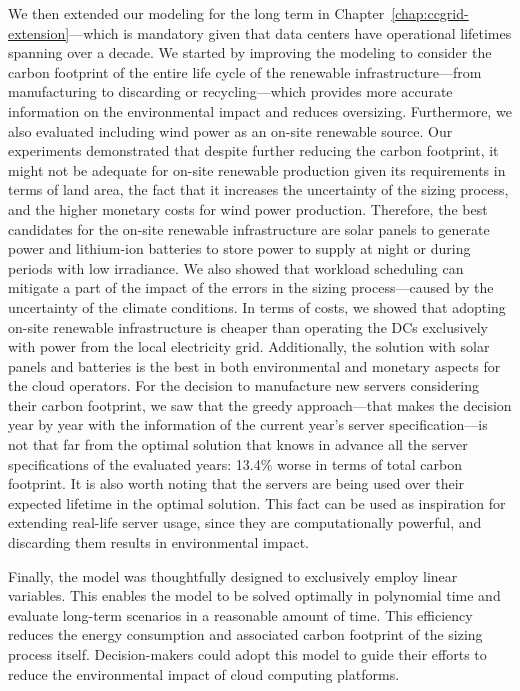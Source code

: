 We then extended our modeling for the long term in Chapter~\ref{chap:ccgrid-extension}---which is mandatory given that data centers have operational lifetimes spanning over a decade. We started by improving the modeling to consider the carbon footprint of the entire life cycle of the renewable infrastructure---from manufacturing to discarding or recycling---which provides more accurate information on the environmental impact and reduces oversizing. Furthermore, we also evaluated including wind power as an on-site renewable source. Our experiments demonstrated that despite further reducing the carbon footprint, it might not be adequate for on-site renewable production given its requirements in terms of land area, the fact that it increases the uncertainty of the sizing process, and the higher monetary costs for wind power production. Therefore, the best candidates for the on-site renewable infrastructure are solar panels to generate power and lithium-ion batteries to store power to supply at night or during periods with low irradiance. We also showed that workload scheduling can mitigate a part of the impact of the errors in the sizing process---caused by the uncertainty of the climate conditions. In terms of costs, we showed that adopting on-site renewable infrastructure is cheaper than operating the DCs exclusively with power from the local electricity grid. Additionally, the solution with solar panels and batteries is the best in both environmental and monetary aspects for the cloud operators. For the decision to manufacture new servers considering their carbon footprint, we saw that the greedy approach---that makes the decision year by year with the information of the current year's server specification---is not that far from the optimal solution that knows in advance all the server specifications of the evaluated years: 13.4\% worse in terms of total carbon footprint. It is also worth noting that the servers are being used over their expected lifetime in the optimal solution. This fact can be used as inspiration for extending real-life server usage, since they are computationally powerful, and discarding them results in environmental impact.

Finally, the model was thoughtfully designed to exclusively employ linear variables. This enables the model to be solved optimally in polynomial time and evaluate long-term scenarios in a reasonable amount of time. This efficiency reduces the energy consumption and associated carbon footprint of the sizing process itself. Decision-makers could adopt this model to guide their efforts to reduce the environmental impact of cloud computing platforms.
